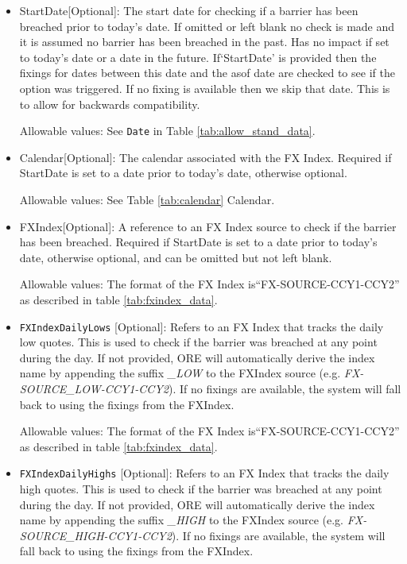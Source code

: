 \begin{itemize}
\item StartDate[Optional]: The start date for checking if a barrier has been breached prior to today's date.  If omitted or left blank no check is made and it is assumed no barrier has been breached in the past. Has no impact if set to today's date or a date in the future. If`StartDate' is provided then the fixings for dates between this date and the asof date are checked to see if the option was triggered. If no fixing is available then we skip that date. This is to allow for backwards compatibility.

Allowable values:  See \lstinline!Date! in Table \ref{tab:allow_stand_data}.

\item Calendar[Optional]: The calendar associated with the FX Index. Required if StartDate is set to a date prior to today's date, otherwise optional.

Allowable values: See Table \ref{tab:calendar} Calendar.

\item FXIndex[Optional]: A reference to an FX Index source to check if the barrier has been breached. Required if StartDate is set to a date prior to today's date, otherwise optional, and can be omitted but not left blank.

Allowable values:  The format of the FX Index is``FX-SOURCE-CCY1-CCY2'' as described in table \ref{tab:fxindex_data}. 
\item \lstinline!FXIndexDailyLows! [Optional]: Refers to an FX Index that tracks the daily low quotes. This is used to check if the barrier was breached at any point during the day. If not provided, ORE will automatically derive the index name by appending the suffix \emph{\_LOW} to the FXIndex source (e.g. \emph{FX-SOURCE\_LOW-CCY1-CCY2}). If no fixings are available, the system will fall back to using the fixings from the FXIndex.

Allowable values:  The format of the FX Index is``FX-SOURCE-CCY1-CCY2'' as described in table \ref{tab:fxindex_data}.  

\item \lstinline!FXIndexDailyHighs! [Optional]: Refers to an FX Index that tracks the daily high quotes. This is used to check if the barrier was breached at any point during the day. If not provided, ORE will automatically derive the index name by appending the suffix \emph{\_HIGH} to the FXIndex source (e.g. \emph{FX-SOURCE\_HIGH-CCY1-CCY2}). If no fixings are available, the system will fall back to using the fixings from the FXIndex.


\end{itemize}

